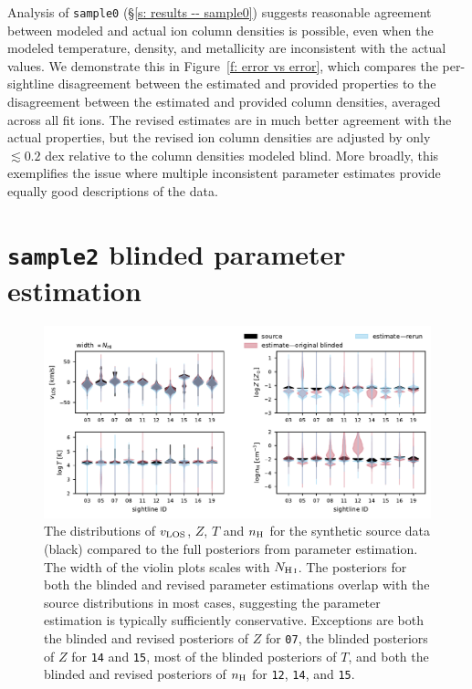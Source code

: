 \documentclass[fleqn,usenatbib]{mnras}
\begin{document}
Analysis of \texttt{sample0} (\S\ref{s: results -- sample0}) suggests reasonable agreement between modeled and actual ion column densities is possible, even when the modeled temperature, density, and metallicity are inconsistent with the actual values.
We demonstrate this in Figure~\ref{f: error vs error},
which compares the per-sightline disagreement between the estimated and provided properties to the disagreement between the estimated and provided column densities, averaged across all fit ions. 
The revised estimates are in much better agreement with the actual properties, but the revised ion column densities are adjusted by only $\lesssim 0.2$ dex relative to the column densities modeled blind.
More broadly, this exemplifies the issue where multiple inconsistent parameter estimates provide equally good descriptions of the data.

\section{\texttt{sample2} blinded parameter estimation}
\label{a: sample2 blinded}

\begin{figure}
    \centering
    \includegraphics[width=\textwidth]{figures/sample2/violin.pdf}
    \caption{
    The distributions of $v_{\rm LOS}$, $Z$, $T$ and $n_{\rm H}$ for the synthetic source data (black) compared to the full posteriors from parameter estimation.
    The width of the violin plots scales with $N_{\ion{H}{I}}$.
    The posteriors for both the blinded and revised parameter estimations overlap with the source distributions in most cases, suggesting the parameter estimation is typically sufficiently conservative.
    Exceptions are
    both the blinded and revised posteriors of $Z$ for \texttt{07},
    the blinded posteriors of $Z$ for \texttt{14} and \texttt{15},
    most of the blinded posteriors of $T$,
    and both the blinded and revised posteriors of $n_{\rm H}$ for \texttt{12}, \texttt{14}, and \texttt{15}.
    }
    \label{f: sample2 violin both}
\end{figure}
\end{document}
